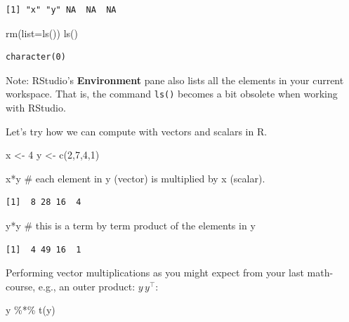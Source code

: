 \documentclass[
  letterpaper,
  DIV=11,
  numbers=noendperiod]{scrreprt}
\newenvironment{Shaded}{\begin{snugshade}}{\end{snugshade}}
\newcommand{\AttributeTok}[1]{\textcolor[rgb]{0.40,0.45,0.13}{#1}}
\newcommand{\CommentTok}[1]{\textcolor[rgb]{0.37,0.37,0.37}{#1}}
\newcommand{\DecValTok}[1]{\textcolor[rgb]{0.68,0.00,0.00}{#1}}
\newcommand{\FunctionTok}[1]{\textcolor[rgb]{0.28,0.35,0.67}{#1}}
\newcommand{\NormalTok}[1]{\textcolor[rgb]{0.00,0.23,0.31}{#1}}
\newcommand{\OtherTok}[1]{\textcolor[rgb]{0.00,0.23,0.31}{#1}}
\newcommand{\SpecialCharTok}[1]{\textcolor[rgb]{0.37,0.37,0.37}{#1}}
\theoremstyle{definition}
\theoremstyle{plain}
\theoremstyle{plain}
\theoremstyle{remark}
\begin{document}
\begin{verbatim}
[1] "x" "y" NA  NA  NA 
\end{verbatim}

\begin{Shaded}
\begin{Highlighting}[]
\FunctionTok{rm}\NormalTok{(}\AttributeTok{list=}\FunctionTok{ls}\NormalTok{())}
\FunctionTok{ls}\NormalTok{()}
\end{Highlighting}
\end{Shaded}

\begin{verbatim}
character(0)
\end{verbatim}

Note: RStudio's \textbf{Environment} pane also lists all the elements in
your current workspace. That is, the command \texttt{ls()} becomes a bit
obsolete when working with RStudio.

Let's try how we can compute with vectors and scalars in R.

\begin{Shaded}
\begin{Highlighting}[]
\NormalTok{x }\OtherTok{\textless{}{-}} \DecValTok{4}
\NormalTok{y }\OtherTok{\textless{}{-}} \FunctionTok{c}\NormalTok{(}\DecValTok{2}\NormalTok{,}\DecValTok{7}\NormalTok{,}\DecValTok{4}\NormalTok{,}\DecValTok{1}\NormalTok{)}

\NormalTok{x}\SpecialCharTok{*}\NormalTok{y }\CommentTok{\# each element in y (vector) is multiplied by x (scalar).}
\end{Highlighting}
\end{Shaded}

\begin{verbatim}
[1]  8 28 16  4
\end{verbatim}

\begin{Shaded}
\begin{Highlighting}[]
\NormalTok{y}\SpecialCharTok{*}\NormalTok{y }\CommentTok{\# this is a term by term product of the elements in y}
\end{Highlighting}
\end{Shaded}

\begin{verbatim}
[1]  4 49 16  1
\end{verbatim}

Performing vector multiplications as you might expect from your last
math-course, e.g., an outer product: \(y\,y^\top\):

\begin{Shaded}
\begin{Highlighting}[]
\NormalTok{y }\SpecialCharTok{\%*\%} \FunctionTok{t}\NormalTok{(y)}
\end{Highlighting}
\end{Shaded}
\end{document}
